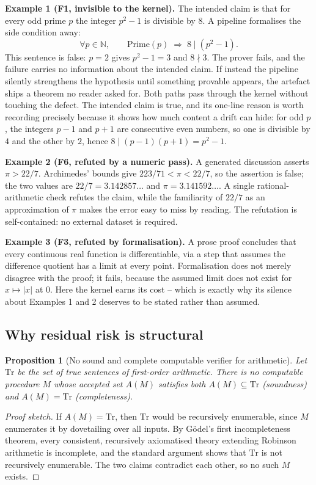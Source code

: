 \documentclass[11pt]{article}
\theoremstyle{plain}
\newtheorem{proposition}{Proposition}
\theoremstyle{definition}
\begin{document}
\textbf{Example 1 (F1, invisible to the kernel).} The intended claim is that for every odd
prime $p$ the integer $p^{2}-1$ is divisible by $8$. A pipeline formalises the side condition
away:
\[
\forall p\in\mathbb{N},\qquad \mathrm{Prime}(p)\;\Longrightarrow\;8 \mid (p^{2}-1).
\]
This sentence is false: $p=2$ gives $p^{2}-1=3$ and $8\nmid 3$. The prover fails, and the
failure carries no information about the intended claim. If instead the pipeline silently
strengthens the hypothesis until something provable appears, the artefact ships a theorem no
reader asked for. Both paths pass through the kernel without touching the defect. The intended
claim is true, and its one-line reason is worth recording precisely because it shows how much
content a drift can hide: for odd $p$, the integers $p-1$ and $p+1$ are consecutive even
numbers, so one is divisible by $4$ and the other by $2$, hence $8\mid(p-1)(p+1)=p^{2}-1$.

\textbf{Example 2 (F6, refuted by a numeric pass).} A generated discussion asserts
$\pi>22/7$. Archimedes' bounds give $223/71<\pi<22/7$, so the assertion is false; the two
values are $22/7=3.142857\ldots$ and $\pi=3.141592\ldots$. A single rational-arithmetic check
refutes the claim, while the familiarity of $22/7$ as an approximation of $\pi$ makes the error
easy to miss by reading. The refutation is self-contained: no external dataset is required.

\textbf{Example 3 (F3, refuted by formalisation).} A prose proof concludes that every continuous
real function is differentiable, via a step that assumes the difference quotient has a limit at
every point. Formalisation does not merely disagree with the proof; it fails, because the
assumed limit does not exist for $x\mapsto|x|$ at $0$. Here the kernel earns its cost -- which is
exactly why its silence about Examples 1 and 2 deserves to be stated rather than assumed.

\subsection{Why residual risk is structural}

\begin{proposition}[No sound and complete computable verifier for arithmetic]
\label{prop:incomplete}
Let $\mathrm{Tr}$ be the set of true sentences of first-order arithmetic. There is no computable
procedure $M$ whose accepted set $A(M)$ satisfies both $A(M)\subseteq\mathrm{Tr}$ (soundness) and
$A(M)=\mathrm{Tr}$ (completeness).
\end{proposition}
\begin{proof}[Proof sketch]
If $A(M)=\mathrm{Tr}$, then $\mathrm{Tr}$ would be recursively enumerable, since $M$ enumerates
it by dovetailing over all inputs. By G\"odel's first incompleteness theorem, every consistent,
recursively axiomatised theory extending Robinson arithmetic is incomplete, and the standard
argument shows that $\mathrm{Tr}$ is not recursively enumerable. The two claims contradict each
other, so no such $M$ exists.
\end{proof}
\end{document}
